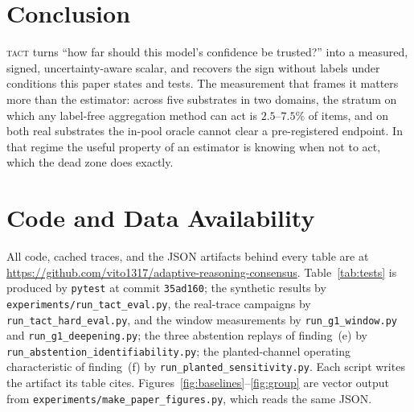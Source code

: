 \documentclass[twoside,11pt]{article}
\newcommand{\TACT}{\textsc{tact}}
\begin{document}
\section{Conclusion}
\TACT{} turns ``how far should this model's confidence be trusted?'' into a
measured, signed, uncertainty-aware scalar, and recovers the sign without
labels under conditions this paper states and tests. The measurement that
frames it matters more than the estimator: across five substrates in two
domains, the stratum on which any label-free aggregation method can act is
$2.5$--$7.5\%$ of items, and on both real substrates the in-pool oracle cannot
clear a pre-registered endpoint. In that regime the useful property of an
estimator is knowing when not to act, which the dead zone does exactly.

\section*{Code and Data Availability}
All code, cached traces, and the JSON artifacts behind every table are at
\url{https://github.com/vito1317/adaptive-reasoning-consensus}. Table~\ref{tab:tests}
is produced by \texttt{pytest} at commit \texttt{35ad160}; the synthetic results by
\texttt{experiments/run\_tact\_eval.py}, the real-trace campaigns by
\texttt{run\_tact\_hard\_eval.py}, and the window measurements by
\texttt{run\_g1\_window.py} and \texttt{run\_g1\_deepening.py}; the three
abstention replays of finding~(e) by \texttt{run\_abstention\_identifiability.py};
the planted-channel operating characteristic of finding~(f) by
\texttt{run\_planted\_sensitivity.py}.
Each script
writes the artifact its table cites. Figures~\ref{fig:baselines}--\ref{fig:group}
are vector output from \texttt{experiments/make\_paper\_figures.py}, which reads
the same JSON.

\appendix
\end{document}
